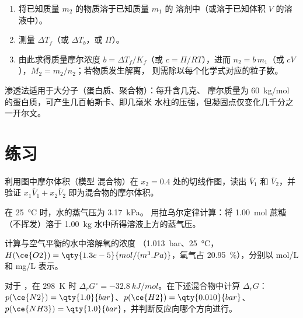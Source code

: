 \begin{method}[由依数性测定摩尔质量]\label{met:b2:chemical-potential:molar-mass}
\begin{enumerate}
  \item 将已知质量 $m_2$ 的物质溶于已知质量 $m_1$ 的
        溶剂中（或溶于已知体积 $V$ 的溶液中）。
  \item 测量 $\Delta T_f$（或 $\Delta T_b$，或 $\Pi$）。
  \item 由此求得质量摩尔浓度 $b = \Delta T_f/K_f$（或 $c = \Pi/RT$），进而 $n_2 =
        b\,m_1$（或 $cV$），$M_2 = m_2/n_2$；若物质发生解离，
        则需除以每个化学式对应的粒子数。
\end{enumerate}
渗透法适用于大分子（蛋白质、聚合物）：每升含几克、
摩尔质量为 \qty{60}{kg/mol} 的蛋白质，可产生几百帕斯卡、即几毫米
水柱的压强，但凝固点仅变化几千分之一开尔文。
\end{method}

\section{练习}

\begin{exercise}[$\star$]\label{exo:b2:chemical-potential:1}
利用图中摩尔体积（模型
混合物）在 $x_2 = 0.4$ 处的切线作图，读出 $\bar V_1$ 和 $\bar V_2$，并验证
$x_1\bar V_1 + x_2\bar V_2$ 即为混合物的摩尔体积。
\end{exercise}

\begin{exercise}[$\star$]\label{exo:b2:chemical-potential:2}
在 \qty{25}{\celsius} 时，水的蒸气压为 \qty{3.17}{kPa}。
用拉乌尔定律计算：将
\qty{1.00}{mol} 蔗糖（不挥发）溶于 \qty{1.00}{kg} 水中所得溶液上方的蒸气压。
\end{exercise}

\begin{exercise}[$\star$]\label{exo:b2:chemical-potential:3}
计算与空气平衡的水中溶解氧的浓度
（\qty{1.013}{bar}、\qty{25}{\celsius}，$H(\ce{O2}) =
\qty{1.3e-5}{mol/(m^3.Pa)}$，氧气占 \qty{20.95}{\percent}），分别以
\unit{mol/L} 和 \unit{mg/L} 表示。
\end{exercise}

\begin{exercise}[$\star$]\label{exo:b2:chemical-potential:4}
对于 ，在 \qty{298}{K} 时 $\Delta_r G^\circ =
\qty{-32.8}{kJ/mol}$。在下述混合物中计算 $\Delta_r G$：
$p(\ce{N2}) = \qty{1.0}{bar}$、$p(\ce{H2}) = \qty{0.010}{bar}$、
$p(\ce{NH3}) = \qty{1.0}{bar}$，并判断反应向哪个方向进行。
\end{exercise}

